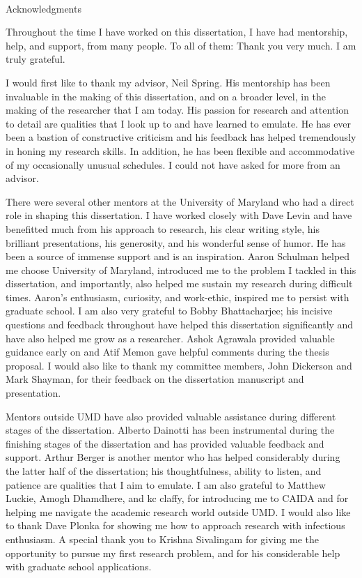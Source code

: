 
\renewcommand{\baselinestretch}{2}
\small\normalsize
\hbox{\ }
\vspace{-.65in}
\begin{center}
\large{Acknowledgments}
\end{center}
\vspace{1ex}

Throughout the time I have worked on this dissertation, I have had mentorship, help, and support, from many people. To all of them: Thank you very much. I am truly grateful.

I would first like to thank my advisor, Neil Spring. His mentorship has been invaluable in the making of this dissertation, and on a broader level, in the making of the researcher that I am today. His passion for research and attention to detail are qualities that I look up to and have learned to emulate. He has ever been a bastion of constructive criticism and his feedback has helped tremendously in honing my research skills. In addition, he has been flexible and accommodative of my occasionally unusual schedules. I could not have asked for more from an advisor.

There were several other mentors at the University of Maryland who had a direct role in shaping this dissertation. I have worked closely with Dave Levin and have benefitted much from his approach to research, his clear writing style, his brilliant presentations, his generosity, and his wonderful sense of humor. He has been a source of immense support and is an inspiration. Aaron Schulman helped me choose University of Maryland, introduced me to the problem I tackled in this dissertation, and importantly, also helped me sustain my research during difficult times. Aaron’s enthusiasm, curiosity, and work-ethic, inspired me to persist with graduate school. I am also very grateful to Bobby Bhattacharjee; his incisive questions and feedback throughout have helped this dissertation significantly and have also helped me grow as a researcher. Ashok Agrawala provided valuable guidance early on and Atif Memon gave helpful comments during the thesis proposal. I would also like to thank my committee members, John Dickerson and Mark Shayman, for their feedback on the dissertation manuscript and presentation. 

Mentors outside UMD have also provided valuable assistance during different stages of the dissertation. Alberto Dainotti has been instrumental during the finishing stages of the dissertation and has provided valuable feedback and support. Arthur Berger is another mentor who has helped considerably during the latter half of the dissertation; his thoughtfulness, ability to listen, and patience are qualities that I aim to emulate. I am also grateful to Matthew Luckie, Amogh Dhamdhere, and kc claffy, for introducing me to CAIDA and for helping me navigate the academic research world outside UMD. I would also like to thank Dave Plonka for showing me how to approach research with infectious enthusiasm. A special thank you to Krishna Sivalingam for giving me the opportunity to pursue my first research problem, and for his considerable help with graduate school applications. 

